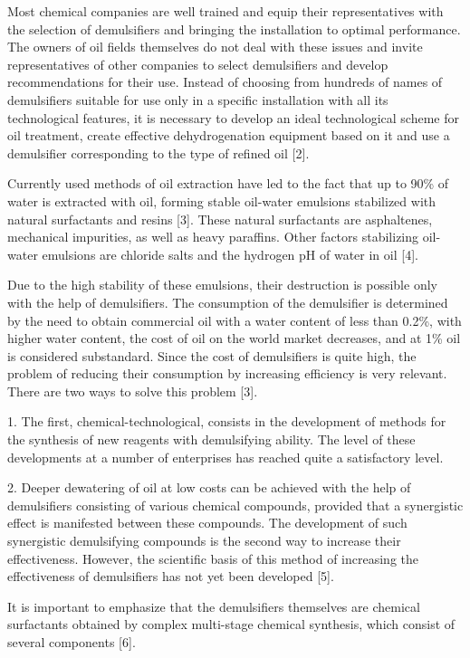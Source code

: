 Most chemical companies are well trained and equip their representatives
with the selection of demulsifiers and bringing the installation to
optimal performance. The owners of oil fields themselves do not deal
with these issues and invite representatives of other companies to
select demulsifiers and develop recommendations for their use. Instead
of choosing from hundreds of names of demulsifiers suitable for use only
in a specific installation with all its technological features, it is
necessary to develop an ideal technological scheme for oil treatment,
create effective dehydrogenation equipment based on it and use a
demulsifier corresponding to the type of refined oil {[}2{]}.

Currently used methods of oil extraction have led to the fact that up to
90\% of water is extracted with oil, forming stable oil-water emulsions
stabilized with natural surfactants and resins {[}3{]}. These natural
surfactants are asphaltenes, mechanical impurities, as well as heavy
paraffins. Other factors stabilizing oil-water emulsions are chloride
salts and the hydrogen pH of water in oil {[}4{]}.

Due to the high stability of these emulsions, their destruction is
possible only with the help of demulsifiers. The consumption of the
demulsifier is determined by the need to obtain commercial oil with a
water content of less than 0.2\%, with higher water content, the cost of
oil on the world market decreases, and at 1\% oil is considered
substandard. Since the cost of demulsifiers is quite high, the problem
of reducing their consumption by increasing efficiency is very relevant.
There are two ways to solve this problem {[}3{]}.

1. The first, chemical-technological, consists in the development of
methods for the synthesis of new reagents with demulsifying ability. The
level of these developments at a number of enterprises has reached quite
a satisfactory level.

2. Deeper dewatering of oil at low costs can be achieved with the help
of demulsifiers consisting of various chemical compounds, provided that
a synergistic effect is manifested between these compounds. The
development of such synergistic demulsifying compounds is the second way
to increase their effectiveness. However, the scientific basis of this
method of increasing the effectiveness of demulsifiers has not yet been
developed {[}5{]}.

It is important to emphasize that the demulsifiers themselves are
chemical surfactants obtained by complex multi-stage chemical synthesis,
which consist of several components {[}6{]}.

